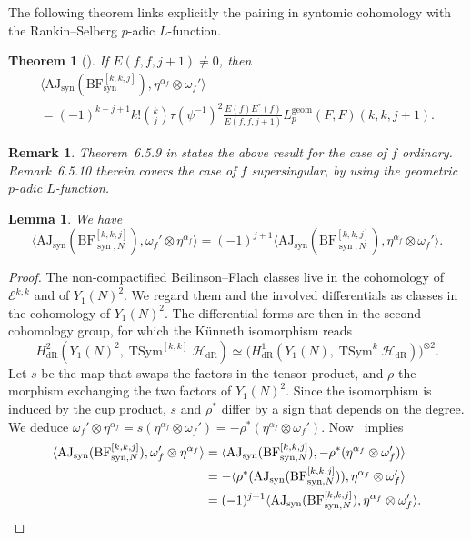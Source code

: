 \documentclass[10pt,a4paper]{amsart}
\newtheorem{theorem}{Theorem}
\newtheorem{lemma}{Lemma}
\newcommand{\BF}{\mathrm{BF}}
\newcommand{\Ell}{\mathcal{E}}
\newcommand{\Lgeom}{L_p^{\mathrm{geom}}}
\DeclareMathOperator{\syn}{syn}
\newcommand{\AJ}{\mathrm{AJ}}
\newcommand{\HS}{\mathscr{H}}
\DeclareMathOperator{\TSym}{TSym}
\DeclareMathOperator{\dR}{dR}
\newtheorem{remark}{Remark}
\begin{document}
The following theorem links explicitly the pairing in syntomic cohomology with the Rankin--Selberg $p$-adic $L$-function.
\begin{theorem}[{\cite[Theorem~6.5.9 and Remark~6.5.10]{KLZ20}}]
    \label{thm:klz-regulator-formula}
    If $E(f,f,j+1)\neq 0$, then
    \begin{multline*}
        \langle \AJ_{\syn}(\BF^{[k,k,j]}_{\syn}),\eta^{\alpha_f}\otimes \omega_f'\rangle \\
        = (-1)^{k-j+1}k!\binom{k}{j}\tau(\psi^{-1})^2\frac{E(f)E^*(f)}{E(f,f,j+1)}\Lgeom(F,F)(k,k,j+1).
    \end{multline*}
\end{theorem}
\begin{remark}
    Theorem~6.5.9 in \cite{KLZ20} states the above result for the case of $f$ ordinary. Remark~6.5.10 therein covers the case of $f$ supersingular, by using the geometric $p$-adic $L$-function.
\end{remark}

\begin{lemma}
    We have
    \[
        \langle \AJ_{\syn}(\BF^{[k,k,j]}_{\syn,N}),\omega_f'\otimes\eta^{\alpha_f}\rangle = (-1)^{j+1} \langle \AJ_{\syn}(\BF^{[k,k,j]}_{\syn,N}),\eta^{\alpha_f}\otimes \omega_f'\rangle.
    \]
\end{lemma}
  \begin{proof}
   The non-compactified Beilinson--Flach classes live in the cohomology of $\Ell^{k, k}$ and of $Y_1(N)^2$. We regard them and the involved differentials as classes in the cohomology of $Y_1(N)^2$. The differential forms are then in the second cohomology group, for which the Künneth isomorphism reads
   \[
    H^2_{\dR}(Y_1(N)^2,\TSym^{[k,k]} \HS_{\dR}) \simeq \bigl(H^1_{\dR}(Y_1(N),\TSym^k \HS_{\dR})\bigr)^{\otimes 2}.
   \]
   Let $s$ be the map that swaps the factors in the tensor product, and $\rho$ the morphism exchanging the two factors of $Y_1(N)^2$. Since the isomorphism is induced by the cup product, $s$ and $\rho^*$ differ by a sign that depends on the degree. We deduce $\omega_f'\otimes\eta^{\alpha_f} = s(\eta^{\alpha_f}\otimes\omega_f') = -\rho^*(\eta^{\alpha_f}\otimes\omega_f')$. Now~\cite[Proposition~5.2.3]{KLZ17} implies
   \begin{align*}
    \langle \AJ_{\syn}(\BF^{[k,k,j]}_{\syn,N}), \omega_f'\otimes\eta^{\alpha_f} \rangle &= \langle \AJ_{\syn}(\BF^{[k,k,j]}_{\syn,N}), -\rho^*(\eta^{\alpha_f}\otimes\omega_f') \rangle \\
    &= -\langle \rho^*(\AJ_{\syn}(\BF^{[k,k,j]}_{\syn,N})), \eta^{\alpha_f}\otimes\omega_f' \rangle \\
    &= (-1)^{j+1} \langle \AJ_{\syn}(\BF^{[k,k,j]}_{\syn,N}), \eta^{\alpha_f}\otimes \omega_f' \rangle.\qedhere
   \end{align*}
  \end{proof}
\end{document}
